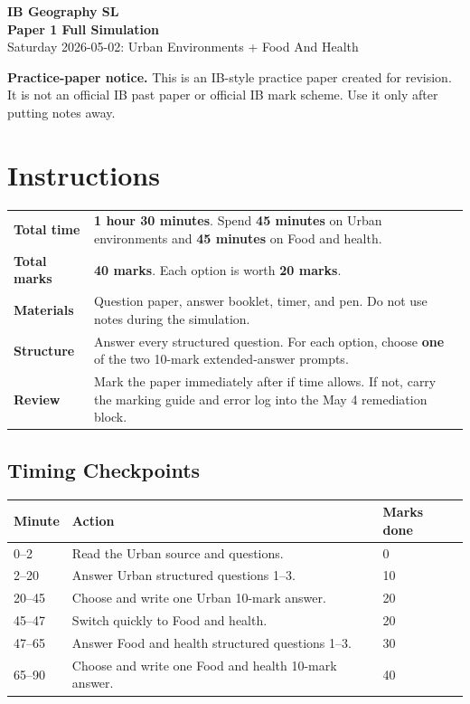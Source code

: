 \documentclass[11pt,a4paper]{article}
\newcommand{\term}[1]{\textcolor{HeadingBlue}{\textbf{#1}}}
\newcommand{\boxnote}[3]{%
\noindent\colorbox{#1}{%
  \begin{minipage}{0.965\textwidth}
  \sffamily
  \textbf{\textcolor{HeadingBlue}{#2}} #3
  \end{minipage}
}}
\begin{document}
\begin{center}
  {\sffamily\bfseries\color{HeadingBlue}\LARGE IB Geography SL}\\[0.2em]
  {\sffamily\bfseries\color{AccentTeal}\Large Paper 1 Full Simulation}\\[0.3em]
  {\sffamily\color{TextInk}Saturday 2026-05-02: Urban Environments + Food And Health}
\end{center}

\vspace{0.35em}

\boxnote{SoftRed}{Practice-paper notice.}{This is an IB-style practice paper
created for revision. It is not an official IB past paper or official IB mark
scheme. Use it only after putting notes away.}

\section{Instructions}

\begin{tabularx}{\textwidth}{L{0.25\textwidth}Y}
\toprule
\textbf{Total time} & \term{1 hour 30 minutes}. Spend \term{45 minutes} on
Urban environments and \term{45 minutes} on Food and health. \\
\textbf{Total marks} & \term{40 marks}. Each option is worth \term{20 marks}. \\
\textbf{Materials} & Question paper, answer booklet, timer, and pen. Do not use
notes during the simulation. \\
\textbf{Structure} & Answer every structured question. For each option, choose
\term{one} of the two 10-mark extended-answer prompts. \\
\textbf{Review} & Mark the paper immediately after if time allows. If not,
carry the marking guide and error log into the May 4 remediation block. \\
\bottomrule
\end{tabularx}

\subsection{Timing Checkpoints}

\begin{tabularx}{\textwidth}{L{0.18\textwidth}Y L{0.2\textwidth}}
\toprule
\textbf{Minute} & \textbf{Action} & \textbf{Marks done} \\
--2 & Read the Urban source and questions. & 0 \\
2--20 & Answer Urban structured questions 1--3. & 10 \\
20--45 & Choose and write one Urban 10-mark answer. & 20 \\
45--47 & Switch quickly to Food and health. & 20 \\
47--65 & Answer Food and health structured questions 1--3. & 30 \\
65--90 & Choose and write one Food and health 10-mark answer. & 40 \\
\bottomrule
\end{tabularx}
\end{document}
